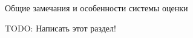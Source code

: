\begin{center}
\textsf{\Huge{Общие замечания и особенности системы оценки}}
\end{center}

TODO: Написать этот раздел!


\pagebreak
